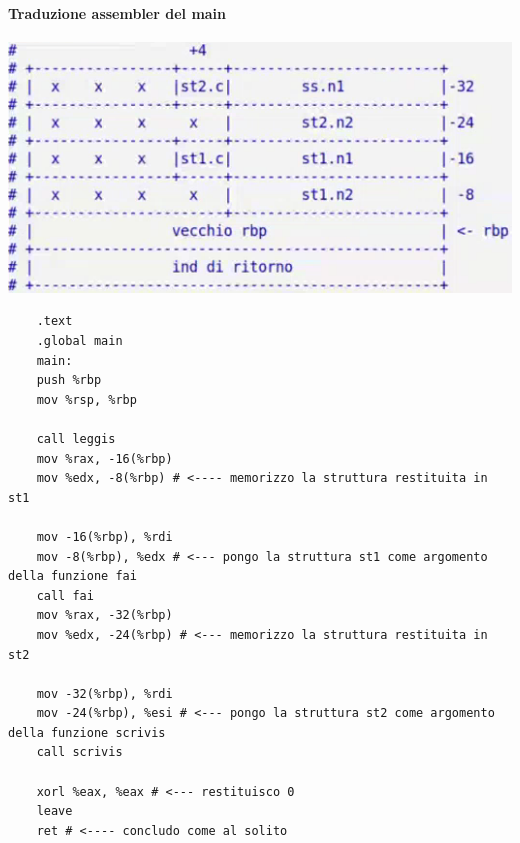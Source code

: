 \paragraph{Traduzione assembler del main}
\begin{center}
	\includegraphics{img/37.PNG}
\end{center} 
\begin{verbatim}
	.text
	.global main
	main:
	push %rbp
	mov %rsp, %rbp
	
	call leggis
	mov %rax, -16(%rbp)
	mov %edx, -8(%rbp) # <---- memorizzo la struttura restituita in st1
	
	mov -16(%rbp), %rdi
	mov -8(%rbp), %edx # <--- pongo la struttura st1 come argomento della funzione fai
	call fai
	mov %rax, -32(%rbp)
	mov %edx, -24(%rbp) # <--- memorizzo la struttura restituita in st2
	
	mov -32(%rbp), %rdi
	mov -24(%rbp), %esi # <--- pongo la struttura st2 come argomento della funzione scrivis
	call scrivis
	
	xorl %eax, %eax # <--- restituisco 0
	leave
	ret # <---- concludo come al solito
\end{verbatim}
\endgroup